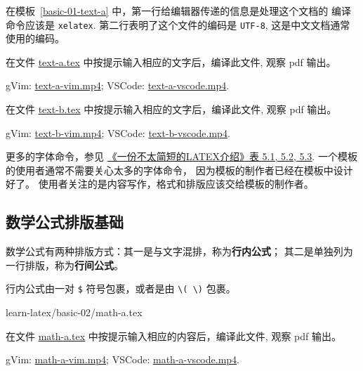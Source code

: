 \documentclass[
    11pt,
    base=hide,
    cite=authoryear,
    device=phone,
    lang=cn,
    mode=simple,
    result=answer,
    toc=onecol,
]{elegantsierxue310}
\begin{document}
在模板~\ref{basic-01-text-a} 中，第一行给编辑器传递的信息是处理这个文档的
编译命令应该是 \texttt{xelatex}.
第二行表明了这个文件的编码是 \texttt{UTF-8}, 这是中文文档通常使用的编码。

\begin{exercise}\label{ex:text-a}
    在文件
    \href{learn-latex/basic-01/text-a.tex}{text-a.tex}
    中按提示输入相应的文字后，编译此文件, 观察 pdf 输出。
\end{exercise}
\begin{cast}\label{cast:text-a}
    gVim: \href{media/casts/text-a-vim.mp4}{text-a-vim.mp4};
    VSCode: \href{media/casts/text-a-vscode.mp4}{text-a-vscode.mp4}.
\end{cast}

\begin{exercise}\label{ex:text-b}
    在文件
    \href{learn-latex/basic-01/text-b.tex}{text-b.tex}
    中按提示输入相应的文字后，编译此文件, 观察 pdf 输出。
\end{exercise}
\begin{cast}\label{cast:text-b}
    gVim: \href{media/casts/text-b-vim.mp4}{text-b-vim.mp4};
    VSCode: \href{media/casts/text-b-vscode.mp4}{text-b-vscode.mp4}.
\end{cast}
\begin{share}\label{share:user-designer}
    更多的字体命令，参见
    \hyperlink{books/lshort-zh-cn.pdf.74}%
    {《一份不太简短的LATEX介绍》表 5.1, 5.2, 5.3}.
    一个模板的使用者通常不需要关心太多的字体命令，
    因为模板的制作者已经在模板中设计好了。
    使用者关注的是内容写作，格式和排版应该交给模板的制作者。
\end{share}

\subsection{数学公式排版基础}%
\label{sub:latex-math-equation}

\begin{latex}\label{tex:math}
    数学公式有两种排版方式：其一是与文字混排，称为\textbf{行内公式}；
    其二是单独列为一行排版，称为\textbf{行间公式}。
\end{latex}

\begin{latex}\label{tex:math-inline}
    行内公式由一对 \texttt{\$} 符号包裹，或者是由 \lstinline|\( \)| 包裹。
\end{latex}
%
{learn-latex/basic-02/math-a.tex}
\begin{exercise}\label{ex:math-a}
    在文件
    \href{learn-latex/basic-02/math-a.tex}{math-a.tex}
    中按提示输入相应的内容后，编译此文件, 观察 pdf 输出。
\end{exercise}
\begin{cast}\label{cast:math-a}
    gVim: \href{media/casts/math-a-vim.mp4}{math-a-vim.mp4};
    VSCode: \href{media/casts/math-a-vscode.mp4}{math-a-vscode.mp4}.
\end{cast}
\end{document}

